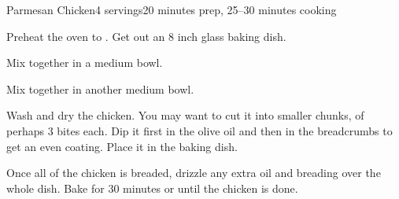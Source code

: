 \documentclass[../Cookbook.tex]{subfiles}
\begin{document}
\begin{recipe}{Parmesan Chicken}{4 servings}{20 minutes prep, 25--30 minutes cooking}

Preheat the oven to . Get out an 8 inch glass baking dish.

Mix together in a medium bowl.

Mix together in another medium bowl.

Wash and dry the chicken. You may want to cut it into smaller chunks, of perhaps 3 bites each. Dip it first in the olive oil and then in the breadcrumbs to get an even coating. Place it in the baking dish.

\newstep
Once all of the chicken is breaded, drizzle any extra oil and breading over the whole dish.
Bake for 30 minutes or until the chicken is done.


\end{recipe}
\end{document}
